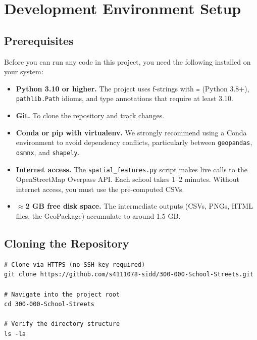 \documentclass[11pt,a4paper,openany]{book}
\begin{document}
\chapter{Development Environment Setup}

\section{Prerequisites}

Before you can run any code in this project, you need the following installed on your system:

\begin{itemize}
  \item \textbf{Python 3.10 or higher.} The project uses f-strings with \texttt{=} (Python 3.8+), \texttt{pathlib.Path} idioms, and type annotations that require at least 3.10.
  \item \textbf{Git.} To clone the repository and track changes.
  \item \textbf{Conda or pip with virtualenv.} We strongly recommend using a Conda environment to avoid dependency conflicts, particularly between \texttt{geopandas}, \texttt{osmnx}, and \texttt{shapely}.
  \item \textbf{Internet access.} The \texttt{spatial\_features.py} script makes live calls to the OpenStreetMap Overpass API. Each school takes 1--2 minutes. Without internet access, you must use the pre-computed CSVs.
  \item \textbf{$\approx$2 GB free disk space.} The intermediate outputs (CSVs, PNGs, HTML files, the GeoPackage) accumulate to around 1.5 GB.
\end{itemize}

\section{Cloning the Repository}

\begin{lstlisting}[style=bash, caption={Clone the project repository}]
# Clone via HTTPS (no SSH key required)
git clone https://github.com/s4111078-sidd/300-000-School-Streets.git

# Navigate into the project root
cd 300-000-School-Streets

# Verify the directory structure
ls -la
\end{lstlisting}
\end{document}
